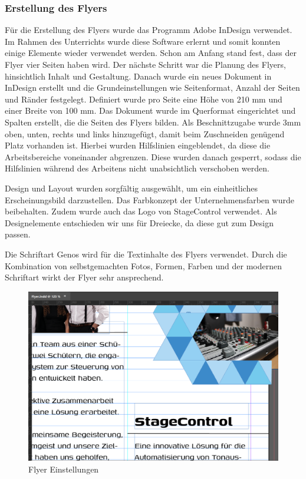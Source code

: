 \newpage
\subsubsection{Erstellung des Flyers}
Für die Erstellung des Flyers wurde das Programm Adobe InDesign verwendet. Im Rahmen des Unterrichts wurde diese Software erlernt und somit konnten einige Elemente wieder verwendet werden. Schon am Anfang stand fest, dass der Flyer vier Seiten haben wird. Der nächste Schritt war die Planung des Flyers, hinsichtlich Inhalt und Gestaltung. Danach wurde ein neues Dokument in InDesign erstellt und die Grundeinstellungen wie Seitenformat, Anzahl der Seiten und Ränder festgelegt. Definiert wurde pro Seite eine Höhe von 210 mm und einer Breite von 100 mm. Das Dokument wurde im Querformat eingerichtet und Spalten erstellt, die die Seiten des Flyers bilden. Als Beschnittzugabe wurde 3mm oben, unten, rechts und links hinzugefügt, damit beim Zuschneiden genügend Platz vorhanden ist. Hierbei wurden Hilfslinien eingeblendet, da diese die Arbeitsbereiche voneinander abgrenzen. Diese wurden danach gesperrt, sodass die Hilfslinien während des Arbeitens nicht unabsichtlich verschoben werden. 

Design und Layout wurden sorgfältig ausgewählt, um ein einheitliches Erscheinungsbild darzustellen. Das Farbkonzept der Unternehmensfarben wurde beibehalten. Zudem wurde auch das Logo von StageControl verwendet. Als Designelemente entschieden wir uns für Dreiecke, da diese gut zum Design passen. 

Die Schriftart Genos wird für die Textinhalte des Flyers verwendet. Durch die Kombination von selbstgemachten Fotos, Formen, Farben und der modernen Schriftart wirkt der Flyer sehr ansprechend. 

\begin{figure}[H]
	\centering
	\includegraphics[width=0.6\linewidth]{images/Flyer Einstellungen.png}
	\caption[Flyer Einstellungen]{Flyer Einstellungen}
	\label{fig:Flyer Einstellungen}
\end{figure}

